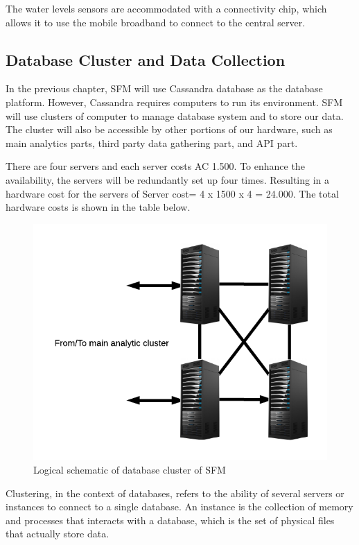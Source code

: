 The water levels sensors are accommodated with a connectivity chip, which allows it to use the mobile broadband to connect to the central server.


\subsection{Database Cluster and Data Collection}
\label{subsec:database-data}
In the previous chapter, SFM will use Cassandra database as the database platform. However, Cassandra requires computers to run its environment. SFM will use clusters of computer to manage database system and to store our data. The cluster will also be accessible by other portions of our hardware, such as main analytics parts, third party data gathering part, and API part.

There are four servers and each server costs AC 1.500. To enhance the availability, the servers will be redundantly set up four times. Resulting in a hardware cost for the servers of
Server cost= 4 x 1500 x 4 = 24.000. The total hardware costs is shown in the table below.

\begin{figure}[hb!]
\centering
\includegraphics[]{6-hardware/images/db-cluster.png}
\caption{Logical schematic of database cluster of SFM}
\label{fig:database-cluster}
\end{figure}

Clustering, in the context of databases, refers to the ability of several servers or instances to connect to a single database. An instance is the collection of memory and processes that interacts with a database, which is the set of physical files that actually store data.

